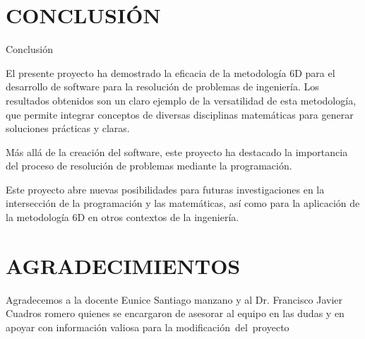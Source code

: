 \documentclass{IEEEcsmag}
\begin{document}
\section{CONCLUSIÓN}

Conclusión

El presente proyecto ha demostrado la eficacia de la metodología 6D para el desarrollo de software para la resolución de problemas de ingeniería. Los resultados obtenidos son un claro ejemplo de la versatilidad de esta metodología, que permite integrar conceptos de diversas disciplinas matemáticas para generar soluciones prácticas y claras.

Más allá de la creación del software, este proyecto ha destacado la importancia del proceso de resolución de problemas mediante la programación.

Este proyecto abre nuevas posibilidades para futuras investigaciones en la intersección de la programación y las matemáticas, así como para la aplicación de la metodología 6D en otros contextos de la ingeniería.
\vspace*{-8pt}


\section{AGRADECIMIENTOS}
Agradecemos a la docente Eunice Santiago manzano y al Dr. Francisco Javier Cuadros romero quienes se encargaron de asesorar al equipo en las dudas y en apoyar con información valiosa para la modificación del proyecto
\end{document}
